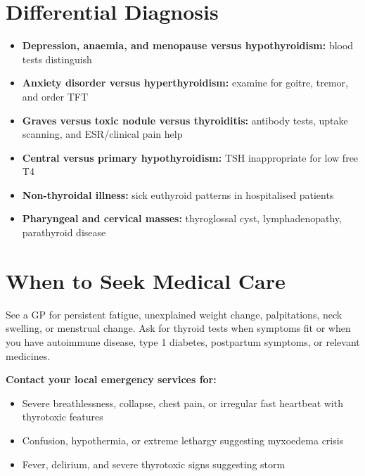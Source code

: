 \section*{Differential Diagnosis}
\begin{itemize}
    \item \textbf{Depression, anaemia, and menopause versus hypothyroidism:} blood tests distinguish
    \item \textbf{Anxiety disorder versus hyperthyroidism:} examine for goitre, tremor, and order TFT
    \item \textbf{Graves versus toxic nodule versus thyroiditis:} antibody tests, uptake scanning, and ESR/clinical pain help
    \item \textbf{Central versus primary hypothyroidism:} TSH inappropriate for low free T4
    \item \textbf{Non-thyroidal illness:} sick euthyroid patterns in hospitalised patients
    \item \textbf{Pharyngeal and cervical masses:} thyroglossal cyst, lymphadenopathy, parathyroid disease
\end{itemize}

\section*{When to Seek Medical Care}
See a GP for persistent fatigue, unexplained weight change, palpitations, neck swelling, or menstrual change. Ask for thyroid tests when symptoms fit or when you have autoimmune disease, type 1 diabetes, postpartum symptoms, or relevant medicines.

\textbf{Contact your local emergency services for:}
\begin{itemize}
    \item Severe breathlessness, collapse, chest pain, or irregular fast heartbeat with thyrotoxic features
    \item Confusion, hypothermia, or extreme lethargy suggesting myxoedema crisis
    \item Fever, delirium, and severe thyrotoxic signs suggesting storm
\end{itemize}

